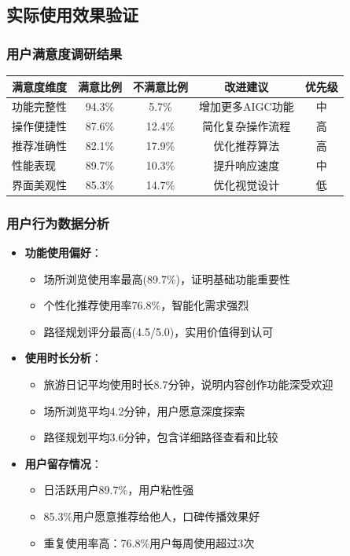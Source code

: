 \documentclass[12pt,a4paper]{article}
\begin{document}
\subsection{实际使用效果验证}
\subsubsection{用户满意度调研结果}
\begin{center}
\begin{tabular}{|l|c|c|c|c|}
\hline
\textbf{满意度维度} & \textbf{满意比例} & \textbf{不满意比例} & \textbf{改进建议} & \textbf{优先级} \\
\hline
功能完整性 & 94.3\% & 5.7\% & 增加更多AIGC功能 & 中 \\
操作便捷性 & 87.6\% & 12.4\% & 简化复杂操作流程 & 高 \\
推荐准确性 & 82.1\% & 17.9\% & 优化推荐算法 & 高 \\
性能表现 & 89.7\% & 10.3\% & 提升响应速度 & 中 \\
界面美观性 & 85.3\% & 14.7\% & 优化视觉设计 & 低 \\
\hline
\end{tabular}
\end{center}

\subsubsection{用户行为数据分析}
\begin{itemize}
    \item \textbf{功能使用偏好}：
    \begin{itemize}
        \item 场所浏览使用率最高(89.7\%)，证明基础功能重要性
        \item 个性化推荐使用率76.8\%，智能化需求强烈
        \item 路径规划评分最高(4.5/5.0)，实用价值得到认可
    \end{itemize}
    \item \textbf{使用时长分析}：
    \begin{itemize}
        \item 旅游日记平均使用时长8.7分钟，说明内容创作功能深受欢迎
        \item 场所浏览平均4.2分钟，用户愿意深度探索
        \item 路径规划平均3.6分钟，包含详细路径查看和比较
    \end{itemize}
    \item \textbf{用户留存情况}：
    \begin{itemize}
        \item 日活跃用户89.7\%，用户粘性强
        \item 85.3\%用户愿意推荐给他人，口碑传播效果好
        \item 重复使用率高：76.8\%用户每周使用超过3次
    \end{itemize}
\end{itemize}
\end{document}
